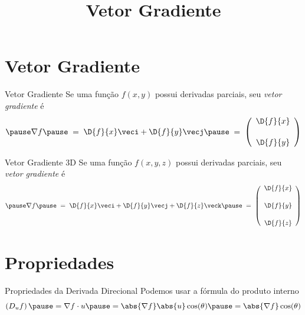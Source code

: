 
\usepackage{calculo_varias_variaveis-1}

\title {Vetor Gradiente}



\addtitle

\section{Vetor Gradiente}

\begin{frame}{Vetor Gradiente}
  Se uma função \(f(x, y)\) possui derivadas parciais,
  \pause
  seu \emph{vetor gradiente} é
  \[
    \pause
    \nabla f
    \pause
    \;=\; \D{f}{x}\veci + \D{f}{y}\vecj
    \pause
    \;=\; \left(\begin{array}{c} \D{f}{x} \\[5mm] \D{f}{y} \end{array}\right)
  \]
\end{frame}

\begin{frame}{Vetor Gradiente 3D}
  Se uma função \(f(x, y, z)\) possui derivadas parciais,
  \pause
  seu \emph{vetor gradiente} é
  \[
    \pause
    \nabla f
    \pause
    \;=\; \D{f}{x}\veci + \D{f}{y}\vecj + \D{f}{z}\veck
    \pause
    \;=\; \left(\begin{array}{c} \D{f}{x} \\[5mm] \D{f}{y} \\[5mm] \D{f}{z} \end{array}\right)
  \]
\end{frame}

\section{Propriedades}

\begin{frame}{Propriedades da Derivada Direcional}
  Podemos usar a fórmula do produto interno
  \[
    \left(D_u f\right)
    \pause
    = \nabla f \cdot u
    \pause
    = \abs{\nabla f} \abs{u} \cos(\theta)
    \pause
    = \abs{\nabla f} \cos(\theta)
  \]
\end{frame}

